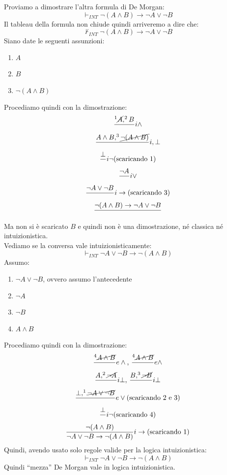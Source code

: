 \documentclass[a4paper,12pt, oneside]{book}
\begin{document}
\begin{esempio}
  Proviamo a dimostrare l'altra formula di De Morgan:
  \[\vdash_{INT}\neg(A\land B)\to \neg A\lor \neg B\]
  Il tableau della formula non chiude quindi arriveremo a dire che:
  \[\nvdash_{INT}\neg(A\land B)\to \neg A\lor \neg B\]
  Siano date le seguenti assunzioni:
  \begin{enumerate}
    \item $A$
    \item $B$
    \item $\neg(A\land B)$
  \end{enumerate}
  Procediamo quindi con la dimostrazione:
  \begin{gather*}
    \frac{^1\cancel{A},^2B}{}i\land\\
    \frac{A\land B, ^3\cancel{\neg(A\land B)}}{}i,\bot\\
    \frac{\bot}{}i\neg\mbox{(scaricando 1)}\\
    \frac{\neg A}{}i\lor\\
    \frac{\neg A \lor \neg B}{}i\to\mbox{(scaricando 3)}\\ 
    \frac{\neg(A\land B)\to\neg A\lor \neg B}{}
  \end{gather*}
  Ma non si è scaricato $B$ e quindi non è una dimostrazione, né classica né
  intuizionistica.\\
  Vediamo se la conversa vale intuizionisticamente:
  \[\vdash_{INT}\neg A\lor \neg B\to\neg(A\land B)\]
  Assumo:
  \begin{enumerate}
    \item $\neg A\lor \neg B$, ovvero assumo l'antecedente
    \item $\neg A$
    \item $\neg B$
    \item $A\land B$
  \end{enumerate}
 Procediamo quindi con la dimostrazione:
 \begin{gather*}
    \frac{ ^4\cancel{A\land B}}{}e\land\mbox{, }
    \frac{ ^4\cancel{A\land B}}{}e\land\\
    \frac{A, ^2\cancel{\neg A}}{}i\bot\mbox{, }
    \frac{B,^3\cancel{\neg B}}{}i\bot\\
    \frac{\bot, ^1\cancel{\neg A\lor \neg B}}{}e\lor\mbox{(scaricando 2 e 3)}\\
    \frac{\bot}{}i\neg\mbox{(scaricando 4)}\\
    \frac{\neg (A\land B)}{\neg A\lor \neg B\to\neg(A\land
      B)}i\to\mbox{(scaricando 1)} 
  \end{gather*}
  Quindi, avendo usato solo regole valide per la logica intuizionistica:
  \[\vdash_{INT}\neg A\lor \neg B\to\neg(A\land B)\]
  Quindi ``mezza'' De Morgan vale in logica intuizionistica.
\end{esempio}
\end{document}
